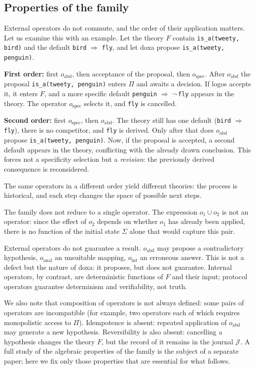 \documentclass[12pt,a4paper]{article}
\begin{document}
\subsection{Properties of the family}
\label{sec:properties}

External operators do not commute, and the order of their application matters.
Let us examine this with an example. Let the theory $F$ contain
\texttt{is\_a(tweety, bird)} and the default
\texttt{bird} $\Rightarrow$ \texttt{fly}, and let doxa propose
\texttt{is\_a(tweety, penguin)}.

\textbf{First order:} first $o_{\text{abd}}$, then acceptance of the
proposal, then $o_{\text{spec}}$. After $o_{\text{abd}}$ the proposal
\texttt{is\_a(tweety, penguin)} enters $\Pi$ and awaits a decision. If logos
accepts it, it enters $F$, and a more specific default
\texttt{penguin} $\Rightarrow$ $\neg$\,\texttt{fly} appears in the theory.
The operator $o_{\text{spec}}$ selects it, and \texttt{fly} is cancelled.

\textbf{Second order:} first $o_{\text{spec}}$, then $o_{\text{abd}}$. The
theory still has one default (\texttt{bird} $\Rightarrow$ \texttt{fly}), there
is no competitor, and \texttt{fly} is derived. Only after that does
$o_{\text{abd}}$ propose \texttt{is\_a(tweety, penguin)}. Now, if the proposal
is accepted, a second default appears in the theory, conflicting with the
already drawn conclusion. This forces not a specificity selection but a
\emph{revision}: the previously derived consequence is reconsidered.

The same operators in a different order yield different theories: the process
is historical, and each step changes the space of possible next steps.

The family does not reduce to a single operator. The expression
$o_1 \cup o_2$ is not an operator: since the effect of $o_2$ depends on
whether $o_1$ has already been applied, there is no function of the initial
state $\Sigma$ alone that would capture this pair.

External operators do not guarantee a result. $o_{\text{abd}}$ may propose a
contradictory hypothesis, $o_{\text{anal}}$ an unsuitable mapping,
$o_{\text{int}}$ an erroneous answer. This is not a defect but the nature of
doxa: it proposes, but does not guarantee. Internal operators, by contrast,
are deterministic functions of $F$ and their input; protocol operators
guarantee determinism and verifiability, not truth.

We also note that composition of operators is not always defined: some pairs
of operators are incompatible (for example, two operators each of which
requires monopolistic access to $\Pi$). Idempotence is absent: repeated
application of $o_{\text{abd}}$ may generate a new hypothesis. Reversibility
is also absent: cancelling a hypothesis changes the theory $F$, but the record
of it remains in the journal $\mathcal{J}$. A full study of the algebraic
properties of the family is the subject of a separate paper; here we fix only
those properties that are essential for what follows.
\end{document}
